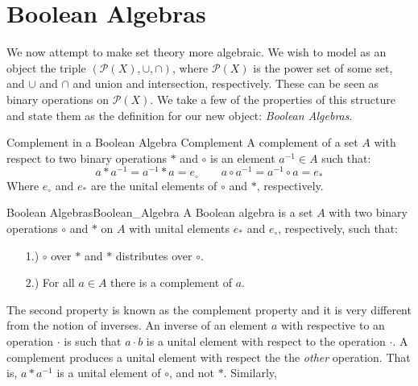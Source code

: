 \section{Boolean Algebras}
    We now attempt to make set theory more algebraic. We wish to model
    as an object the triple $(\mathcal{P}(X),\cup,\cap)$, where
    $\mathcal{P}(X)$ is the \gls{power set} of some set, and $\cup$ and
    $\cap$ and union and intersection, respectively. These can be seen as
    binary operations on $\mathcal{P}(X)$. We take a few of the properties
    of this structure and state them as the definition for our new object:
    \textit{Boolean Algebras}.
    \begin{fdefinition}{Complement in a Boolean Algebra}
                       {Complement}
        A complement of a \gls{set} $A$ with respect to two
        \glspl{binary operation} $*$ and $\circ$ is an element
        $a^{\minus{1}}\in{A}$ such that:
        \begin{equation*}
            a*a^{\minus{1}}=a^{\minus{1}}*a=e_{\circ}
            \quad\quad
            a\circ{a}^{\minus{1}}=a^{\minus{1}}\circ{a}=e_{*}
        \end{equation*}
        Where $e_{\circ}$ and $e_{*}$ are the \glspl{unital element} of
        $\circ$ and $*$, respectively.
    \end{fdefinition}
    \begin{fdefinition}{Boolean Algebras}{Boolean_Algebra}
        A Boolean algebra is a set $A$ with two
         \glspl{binary operation}
        $\circ$ and $*$ on $A$ with \glspl{unital element} $e_{*}$ and
        $e_{\circ}$, respectively, such that:
        \begin{itemize}
            \item[1.)]  $\circ$ 
                        over $*$ and $*$ distributes over $\circ$.
            \item[2.)]  For all $a\in{A}$ there is a complement of $a$.
        \end{itemize}
    \end{fdefinition}
    The second property is known as the complement property and it is very
    different from the notion of inverses. An inverse of an element $a$ with
    respective to an operation $\cdot$ is such that $a\cdot{b}$ is a unital
    element with respect to the operation $\cdot$. A complement produces a
    unital element with respect the the \textit{other} operation. That is,
    $a*a^{\minus{1}}$ is a unital element of $\circ$, and not $*$. Similarly,
